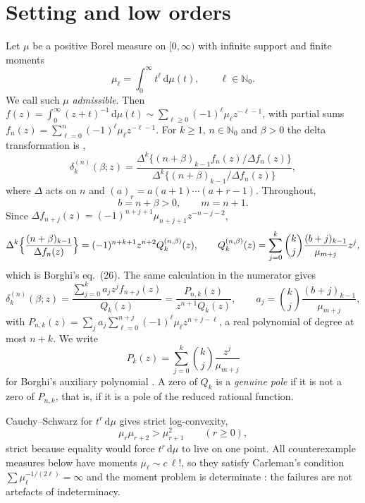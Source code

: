 \documentclass[11pt,a4paper]{article}
\theoremstyle{definition}
\theoremstyle{remark}
\newcommand{\dd}{\,\mathrm{d}}
\newcommand{\Nzero}{\mathbb{N}_0}
\begin{document}
\section{Setting and low orders}\label{sec:setting}

Let $\mu$ be a positive Borel measure on $[0,\infty)$ with infinite support
and finite moments
\begin{equation}\label{eq:moments}
 \mu_\ell=\int_0^\infty t^\ell\dd\mu(t),\qquad \ell\in\Nzero .
\end{equation}
We call such $\mu$ \emph{admissible}. Then
$f(z)=\int_0^\infty(z+t)^{-1}\dd\mu(t)\sim\sum_{\ell\ge0}(-1)^\ell\mu_\ell
z^{-\ell-1}$, with partial sums
$f_n(z)=\sum_{\ell=0}^n(-1)^\ell\mu_\ell z^{-\ell-1}$. For $k\ge1$,
$n\in\Nzero$ and $\beta>0$ the delta transformation is
\cite{Weniger1989}, \cite[eq.~(23)]{Borghi2026}
\begin{equation}\label{eq:delta}
 \delta_k^{(n)}(\beta;z)
 =\frac{\Delta^k\{(n+\beta)_{k-1}f_n(z)/\Delta f_n(z)\}}
        {\Delta^k\{(n+\beta)_{k-1}/\Delta f_n(z)\}},
\end{equation}
where $\Delta$ acts on $n$ and $(a)_r=a(a+1)\cdots(a+r-1)$. Throughout,
\[
 b=n+\beta>0,\qquad m=n+1 .
\]
Since $\Delta f_{n+j}(z)=(-1)^{n+j+1}\mu_{n+j+1}z^{-n-j-2}$,
\begin{equation}\label{eq:DeltaQ}
 \Delta^k\Bigl\{\frac{(n+\beta)_{k-1}}{\Delta f_n(z)}\Bigr\}
 =(-1)^{n+k+1}z^{n+2}Q_k^{(n,\beta)}(z),\qquad
 Q_k^{(n,\beta)}(z)=\sum_{j=0}^k\binom{k}{j}\frac{(b+j)_{k-1}}{\mu_{m+j}}z^j,
\end{equation}
which is Borghi's eq.~(26). The same calculation in the numerator gives
\begin{equation}\label{eq:rational}
 \delta_k^{(n)}(\beta;z)=\frac{\sum_{j=0}^k a_jz^jf_{n+j}(z)}{Q_k(z)}
 =\frac{P_{n,k}(z)}{z^{n+1}Q_k(z)},\qquad
 a_j=\binom kj\frac{(b+j)_{k-1}}{\mu_{m+j}},
\end{equation}
with $P_{n,k}(z)=\sum_ja_j\sum_{\ell=0}^{n+j}(-1)^\ell\mu_\ell z^{n+j-\ell}$, a
real polynomial of degree at most $n+k$. We write
\begin{equation}\label{eq:borghiP}
 P_k(z)=\sum_{j=0}^k\binom kj\frac{z^j}{\mu_{m+j}}
\end{equation}
for Borghi's auxiliary polynomial \cite[eq.~(27)]{Borghi2026}. A zero of
$Q_k$ is a \emph{genuine pole} if it is not a zero of $P_{n,k}$, that is,
if it is a pole of the reduced rational function.

Cauchy--Schwarz for $t^r\dd\mu$ gives strict log-convexity,
\begin{equation}\label{eq:logconvex}
 \mu_r\mu_{r+2}>\mu_{r+1}^2\qquad(r\ge0),
\end{equation}
strict because equality would force $t^r\dd\mu$ to live on one point. All
counterexample measures below have moments $\mu_\ell\sim c\,\ell!$, so they
satisfy Carleman's condition $\sum\mu_\ell^{-1/(2\ell)}=\infty$ and the
moment problem is determinate \cite{Schmudgen2017}:
the failures are not artefacts of indeterminacy.
\end{document}
